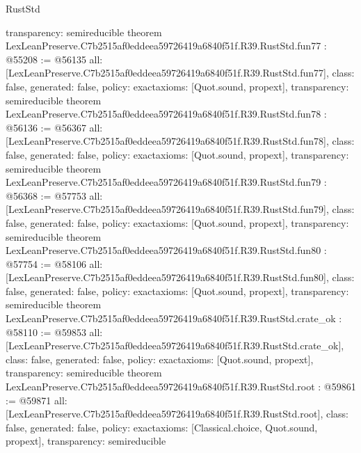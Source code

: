 \begin{lexlean}{RustStd}
\begin{coremodule}
{  transparency: semireducible
}
theorem LexLeanPreserve.C7b2515af0eddeea59726419a6840f51f.R39.RustStd.fun77 : @55208 := @56135 {
  all: [LexLeanPreserve.C7b2515af0eddeea59726419a6840f51f.R39.RustStd.fun77],
  class: false,
  generated: false,
  policy: exact{axioms: [Quot.sound, propext]},
  transparency: semireducible
}
theorem LexLeanPreserve.C7b2515af0eddeea59726419a6840f51f.R39.RustStd.fun78 : @56136 := @56367 {
  all: [LexLeanPreserve.C7b2515af0eddeea59726419a6840f51f.R39.RustStd.fun78],
  class: false,
  generated: false,
  policy: exact{axioms: [Quot.sound, propext]},
  transparency: semireducible
}
theorem LexLeanPreserve.C7b2515af0eddeea59726419a6840f51f.R39.RustStd.fun79 : @56368 := @57753 {
  all: [LexLeanPreserve.C7b2515af0eddeea59726419a6840f51f.R39.RustStd.fun79],
  class: false,
  generated: false,
  policy: exact{axioms: [Quot.sound, propext]},
  transparency: semireducible
}
theorem LexLeanPreserve.C7b2515af0eddeea59726419a6840f51f.R39.RustStd.fun80 : @57754 := @58106 {
  all: [LexLeanPreserve.C7b2515af0eddeea59726419a6840f51f.R39.RustStd.fun80],
  class: false,
  generated: false,
  policy: exact{axioms: [Quot.sound, propext]},
  transparency: semireducible
}
theorem LexLeanPreserve.C7b2515af0eddeea59726419a6840f51f.R39.RustStd.crate_ok : @58110 := @59853 {
  all: [LexLeanPreserve.C7b2515af0eddeea59726419a6840f51f.R39.RustStd.crate_ok],
  class: false,
  generated: false,
  policy: exact{axioms: [Quot.sound, propext]},
  transparency: semireducible
}
theorem LexLeanPreserve.C7b2515af0eddeea59726419a6840f51f.R39.RustStd.root : @59861 := @59871 {
  all: [LexLeanPreserve.C7b2515af0eddeea59726419a6840f51f.R39.RustStd.root],
  class: false,
  generated: false,
  policy: exact{axioms: [Classical.choice, Quot.sound, propext]},
  transparency: semireducible
}


\end{coremodule}
\end{lexlean}

